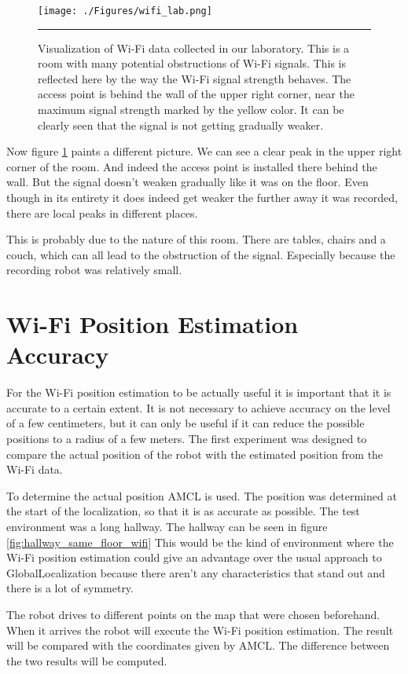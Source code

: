 \begin{figure}[htbp]
	\centering
		\texttt{[image: ./Figures/wifi\_lab.png]}
		\rule{35em}{0.5pt}
	\caption[Hallway Wi-Fi data]{Visualization of Wi-Fi data collected in our laboratory. This is a room with many potential obstructions of Wi-Fi signals. This is reflected here by the way the Wi-Fi signal strength behaves. The access point is behind the wall of the upper right corner, near the maximum signal strength marked by the yellow color. It can be clearly seen that the signal is not getting gradually weaker.}
	\label{fig:wifi_lab}
\end{figure}
Now figure \ref{fig:wifi_lab} paints a different picture. We can see a clear peak in the upper right corner of the room. And indeed the access point is installed there behind the wall. But the signal doesn't weaken gradually like it was on the floor. Even though in its entirety it does indeed get weaker the further away it was recorded, there are local peaks in different places. 

This is probably due to the nature of this room. There are tables, chairs and a couch, which can all lead to the obstruction of the signal. Especially because the recording robot was relatively small. 

\section{Wi-Fi Position Estimation Accuracy}\label{sec:acc}
For the Wi-Fi position estimation to be actually useful it is important that it is accurate to a certain extent. It is not necessary to achieve accuracy on the level of a few centimeters, but it can only be useful if it can reduce the possible positions to a radius of a few meters. The first experiment was designed to compare the actual position of the robot with the estimated position from the Wi-Fi data. 

To determine the actual position AMCL is used. The position was determined at the start of the localization, so that it is as accurate as possible. The test environment was a long hallway. The hallway can be seen in figure \ref{fig:hallway_same_floor_wifi} This would be the kind of environment where the Wi-Fi position estimation could give an advantage over the usual approach to \gls{GlobalLocalization} because there aren't any characteristics that stand out and there is a lot of symmetry. 

The robot drives to different points on the map that were chosen beforehand. When it arrives the robot will execute the Wi-Fi position estimation. The result will be compared with the coordinates given by AMCL. The difference between the two results will be computed.

